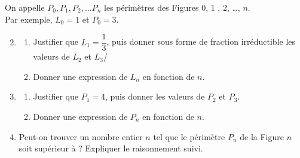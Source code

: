 \begin{exercice}[CRPE 2020 G7]
   On appelle $P_0 , P_1 , P_2 , \dots P_n$ les périmètres des Figures 0, 1 , 2, \dots, $n$. \\
   Par exemple, $L_0 = 1$ et $P_0 = 3$. \\
   \begin{enumerate}
   \setcounter{enumi}{1}
      \item
         \begin{enumerate}
            \item Justifier que $L_1 =\dfrac13$, puis donner sous forme de fraction irréductible les valeurs de $L_2$ et $L_3$/ \smallskip
            \item Donner une expression de $L_n$ en fonction de $n$.
         \end{enumerate}
      \item
         \begin{enumerate}
            \item Justifier que $P_1 =4$, puis donner les valeurs de $P_2$ et $P_3$.
            \item Donner une expression de $P_n$ en fonction de $n$.
         \end{enumerate}
      \item Peut-on trouver un nombre entier $n$ tel que le périmètre $P_n$ de la Figure $n$ soit supérieur à  ? Expliquer le raisonnement suivi.
   \end{enumerate}
\end{exercice}

